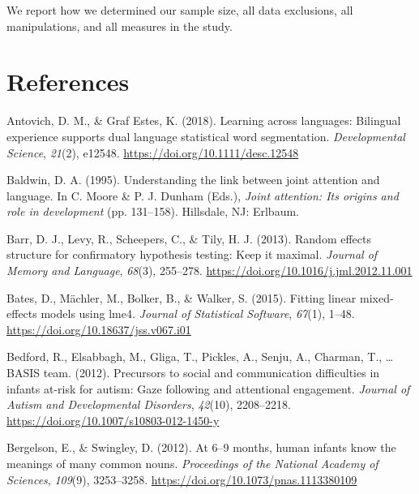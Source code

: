 \documentclass[english,,man,floatsintext]{apa6}
\begin{document}
We report how we determined our sample size, all data exclusions, all manipulations, and all measures in the study.

\newpage

\hypertarget{references}{%
\section{References}\label{references}}

\begingroup
\setlength{\parindent}{-0.5in}
\setlength{\leftskip}{0.5in}

\hypertarget{refs}{}
\leavevmode\hypertarget{ref-Antovich_GrafEstes_2017}{}%
Antovich, D. M., \& Graf Estes, K. (2018). Learning across languages: Bilingual experience supports dual language statistical word segmentation. \emph{Developmental Science}, \emph{21}(2), e12548. \url{https://doi.org/10.1111/desc.12548}

\leavevmode\hypertarget{ref-Baldwin_1995}{}%
Baldwin, D. A. (1995). Understanding the link between joint attention and language. In C. Moore \& P. J. Dunham (Eds.), \emph{Joint attention: Its origins and role in development} (pp. 131--158). Hillsdale, NJ: Erlbaum.

\leavevmode\hypertarget{ref-Barr_etal_2013}{}%
Barr, D. J., Levy, R., Scheepers, C., \& Tily, H. J. (2013). Random effects structure for confirmatory hypothesis testing: Keep it maximal. \emph{Journal of Memory and Language}, \emph{68}(3), 255--278. \url{https://doi.org/10.1016/j.jml.2012.11.001}

\leavevmode\hypertarget{ref-Bates_etal_2015}{}%
Bates, D., Mächler, M., Bolker, B., \& Walker, S. (2015). Fitting linear mixed-effects models using lme4. \emph{Journal of Statistical Software}, \emph{67}(1), 1--48. \url{https://doi.org/10.18637/jss.v067.i01}

\leavevmode\hypertarget{ref-Bedford_etal_2012}{}%
Bedford, R., Elsabbagh, M., Gliga, T., Pickles, A., Senju, A., Charman, T., \ldots{} BASIS team. (2012). Precursors to social and communication difficulties in infants at-risk for autism: Gaze following and attentional engagement. \emph{Journal of Autism and Developmental Disorders}, \emph{42}(10), 2208--2218. \url{https://doi.org/10.1007/s10803-012-1450-y}

\leavevmode\hypertarget{ref-Bergelson_Swingley_2012}{}%
Bergelson, E., \& Swingley, D. (2012). At 6--9 months, human infants know the meanings of many common nouns. \emph{Proceedings of the National Academy of Sciences}, \emph{109}(9), 3253--3258. \url{https://doi.org/10.1073/pnas.1113380109}
\end{document}
